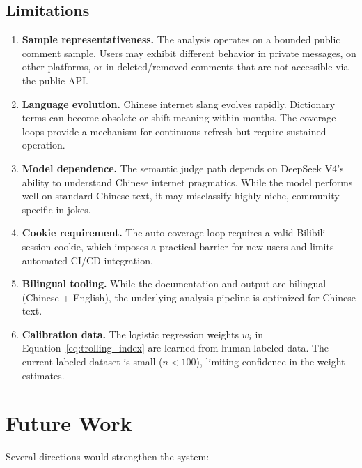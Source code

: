 \documentclass[11pt,a4paper]{article}
\begin{document}
\subsection{Limitations}

\begin{enumerate}
  \item \textbf{Sample representativeness.} The analysis operates on a bounded public
    comment sample. Users may exhibit different behavior in private messages, on other
    platforms, or in deleted/removed comments that are not accessible via the public API.
  \item \textbf{Language evolution.} Chinese internet slang evolves rapidly. Dictionary
    terms can become obsolete or shift meaning within months. The coverage loops provide
    a mechanism for continuous refresh but require sustained operation.
  \item \textbf{Model dependence.} The semantic judge path depends on DeepSeek V4's
    ability to understand Chinese internet pragmatics. While the model performs well on
    standard Chinese text, it may misclassify highly niche, community-specific in-jokes.
  \item \textbf{Cookie requirement.} The auto-coverage loop requires a valid Bilibili
    session cookie, which imposes a practical barrier for new users and limits
    automated CI/CD integration.
  \item \textbf{Bilingual tooling.} While the documentation and output are bilingual
    (Chinese + English), the underlying analysis pipeline is optimized for Chinese text.
  \item \textbf{Calibration data.} The logistic regression weights $w_i$ in
    Equation~\ref{eq:trolling_index} are learned from human-labeled data. The current
    labeled dataset is small ($n < 100$), limiting confidence in the weight estimates.
\end{enumerate}


\section{Future Work}

Several directions would strengthen the system:
\end{document}
